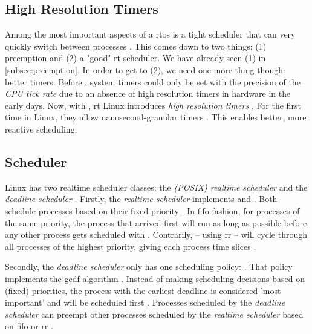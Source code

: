 \documentclass[10pt,twocolumn,a4paper]{article}
\begin{document}
\subsection{High Resolution Timers}\label{subsec:hr-timers}
Among the most important aspects of a \acrshort{rtos} is a tight scheduler that can very quickly switch between processes \cite{reghenzani_realtime_2019}.
This comes down to two things; (1) preemption and (2) a "good" \acrshort{rt} scheduler.
We have already seen (1) in \autoref{subsec:preemption}.
In order to get to (2), we need one more thing though: better timers.
Before , system timers could only be set with the precision of the \emph{CPU tick rate} \cite{reghenzani_realtime_2019} due to an absence of high resolution timers in hardware in the early days.
Now, with , \acrshort{rt} Linux introduces \emph{high resolution timers} \cite{lf:timers}.
For the first time in Linux, they allow nanosecond-granular timers \cite{reghenzani_realtime_2019}.
This enables better, more reactive scheduling.

\subsection{Scheduler}\label{subsec:scheduler}
Linux has two realtime scheduler classes; the \emph{(POSIX) realtime scheduler} and the \emph{deadline scheduler} \cite{bristot_de_oliveira_deadline_2018}.
Firstly, the \emph{realtime scheduler} implements  and  \cite{lf:scheduler}.
Both schedule processes based on their fixed priority \cite{lf:scheduler,de_oliveira_timing_2016}.
In \acrfull{fifo} fashion, for processes of the same priority, the process that arrived first will run as long as possible before any other process gets scheduled with .
Contrarily,  -- using \acrfull{rr} -- will cycle through all processes of the highest priority, giving each process time slices \cite{bristot_de_oliveira_deadline_2018}.

Secondly, the \emph{deadline scheduler} only has one scheduling policy:  \cite{bristot_de_oliveira_deadline_2018}.
That policy implements the \acrfull{gedf} algorithm \cite{lelli_deadline_2016}.
Instead of making scheduling decisions based on (fixed) priorities, the process with the earliest deadline is considered 'most important' and will be scheduled first \cite{bristot_de_oliveira_deadline_2018}.
Processes scheduled by the \emph{deadline scheduler} can preempt other processes scheduled by the \emph{realtime scheduler} based on \acrshort{fifo} or \acrshort{rr} \cite{lf:scheduler}.
\end{document}

